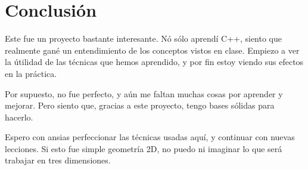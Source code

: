 \section{Conclusión}
\label{conclusion}

Este fue un proyecto bastante interesante. Nó sólo aprendí C++, siento que realmente
gané un entendimiento de los conceptos vistos en clase. Empiezo a ver la útilidad
de las técnicas que hemos aprendido, y por fin estoy viendo sus efectos en la
práctica.

Por supuesto, no fue perfecto, y aún me faltan muchas cosas por aprender y mejorar.
Pero siento que, gracias a este proyecto, tengo bases sólidas para hacerlo.

Espero con ansias perfeccionar las técnicas usadas aquí, y continuar con nuevas lecciones.
Si esto fue simple geometría 2D, no puedo ni imaginar lo que será trabajar en tres
dimensiones.